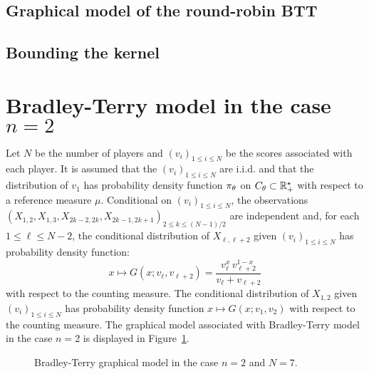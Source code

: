 \subsection{Graphical model of the round-robin BTT}

\subsection{Bounding the kernel}

\section*{Bradley-Terry model in the case $n=2$}
Let $N$ be the number of players and $(v_i)_{1\le i\le N}$ be the scores associated with each player. It is assumed that the $(v_i)_{1\le i\le N}$ are i.i.d. and that the distribution of $v_1$ has probability density function $\pi_{\theta}$ on $C_{\theta}\subset \mathbb{R}_+^{\star}$ with respect to a reference measure $\mu$. Conditional on $(v_i)_{1 \le i \le N}$, the observations $(X_{1,2},X_{1,3}, X_{2k-2,2k}, X_{2k-1,2k+1})_{2\le k \le (N-1)/2}$ are independent and, for each $1\le \ell\le N-2$, the conditional distribution of $X_{\ell,\ell+2}$ given $(v_i)_{1\le i\le N}$ has probability density function:
\begin{equation}
\label{eq:defG}
x\mapsto G (x;v_{\ell},v_{\ell+2}) = \frac{v_{\ell}^x\,v_{\ell+2}^{1-x}}{v_{\ell} + v_{\ell+2}}
\end{equation}
with respect to the counting measure. The conditional distribution of $X_{1,2}$ given $(v_i)_{1\le i\le N}$ has probability density function $x\mapsto G (x;v_{1},v_{2})$ with respect to the counting measure.
The graphical model associated with Bradley-Terry model in the case $n=2$ is displayed in Figure~\ref{fig:bt}.
\begin{figure}[h!]
\centering
{}
\caption{Bradley-Terry graphical model in the case $n=2$ and $N=7$.}
\label{fig:bt}
\end{figure}

